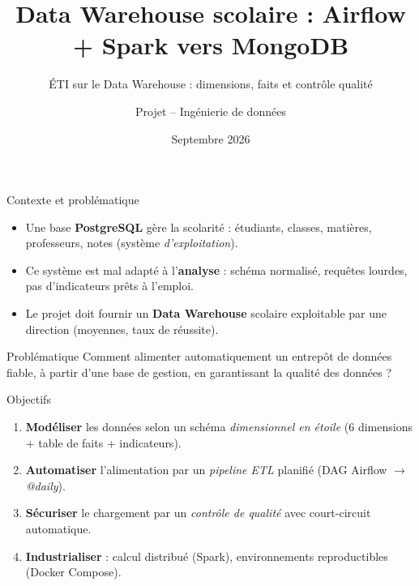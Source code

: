 \documentclass[10pt]{beamer}
\title[Data Warehouse scolaire]{Data Warehouse scolaire : Airflow + Spark vers MongoDB}
\subtitle{ÉTI sur le Data Warehouse : dimensions, faits et contrôle qualité}
\author[Équipe projet]{Projet -- Ingénierie de données}
\date{Septembre 2026}
\begin{document}
\begin{frame}
  \titlepage
\end{frame}

\begin{frame}{Contexte et problématique}
  \begin{itemize}
    \item Une base \textbf{PostgreSQL} gère la scolarité : étudiants, classes, matières,
          professeurs, notes (système \emph{d'exploitation}).
    \item Ce système est mal adapté à l'\textbf{analyse} : schéma normalisé, requêtes lourdes,
          pas d'indicateurs prêts à l'emploi.
    \item Le projet doit fournir un \textbf{Data Warehouse} scolaire exploitable par une
          direction (moyennes, taux de réussite).
  \end{itemize}
  \vfill
  \begin{block}{Problématique}
    Comment alimenter automatiquement un entrepôt de données fiable, à partir d'une base de
    gestion, en garantissant la qualité des données ?
  \end{block}
\end{frame}

\begin{frame}{Objectifs}
  \begin{enumerate}
    \item \textbf{Modéliser} les données selon un schéma \emph{dimensionnel en étoile}
          (6 dimensions + table de faits + indicateurs).
    \item \textbf{Automatiser} l'alimentation par un \emph{pipeline ETL} planifié
          (DAG Airflow $\rightarrow$ {\large\emph{@daily}}).
    \item \textbf{Sécuriser} le chargement par un \emph{contrôle de qualité} avec
          court-circuit automatique.
    \item \textbf{Industrialiser} : calcul distribué (Spark), environnements reproductibles
          (Docker Compose).
  \end{enumerate}
\end{frame}
\end{document}
